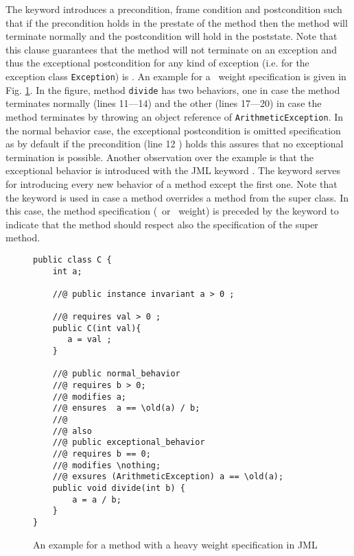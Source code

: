 The keyword   introduces a precondition, frame condition and postcondition 
such that if the precondition holds in the prestate of the
 method then the method will terminate normally and the postcondition will hold in the poststate.
 Note that this clause guarantees that the method will not terminate on an exception and thus the exceptional postcondition 
for any kind of exception (i.e. for the exception class  \texttt{Exception}) is  .
An example for a \heavy \ weight specification is given in Fig. \ref{bml:heavySp}. In the figure, method \texttt{divide} has 
two behaviors, one in case the method terminates normally (lines 11---14) and the other (lines 17---20) in case the method
 terminates by throwing an object reference of \texttt{ArithmeticException}.
 In the normal behavior case, the exceptional postcondition is omitted  specification as by default if the precondition (line 12 )
 holds this assures that no exceptional
 termination is possible. Another observation over the example is that the exceptional behavior is introduced with the JML keyword . 
 The keyword   serves for introducing every new behavior of a method except the first one. Note that the keyword  
 is used in case a  method overrides a method from the super class. In this case, the method specification (\heavy \ or \light \ weight) is preceded by the keyword  
 to indicate that the method should respect also the specification of the super method.


   
\begin{figure}
\begin{lstlisting}[frame=trbl]
public class C {
    int a;
    
    //@ public instance invariant a > 0 ;
    
    //@ requires val > 0 ;
    public C(int val){
       a = val ;
    }
   
    //@ public normal_behavior
    //@ requires b > 0;
    //@ modifies a;
    //@ ensures  a == \old(a) / b;  
    //@
    //@ also 
    //@ public exceptional_behavior
    //@ requires b == 0;
    //@ modifies \nothing;
    //@ exsures (ArithmeticException) a == \old(a);
    public void divide(int b) {
        a = a / b;
    }
}
\end{lstlisting}
\caption{\sc An example for a method with a heavy weight specification in JML} \label{bml:heavySp}
\end{figure}


